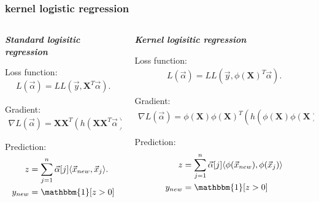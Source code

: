 \documentclass[handout,compress]{beamer}
\newcommand{\bv}[1]{\mathbf{#1}}
\begin{document}
\begin{frame} 
	\frametitle{kernel logistic regression}
	\begin{columns}[t]
		\begin{column}{.5\textwidth}
			\emph{\textbf{Standard logisitic regression}}
			\vspace{1em}
			
			Loss function: 
			\begin{align*}
			L(\vec{\alpha}) = LL(\vec{y}, \bv{X}^T\vec{\alpha}).
			\end{align*}
			
			
			Gradient:
			\begin{align*}
			\nabla L(\vec{\alpha}) = \bv{X}\bv{X}^T(h(\bv{X}\bv{X}^T\vec{\alpha}) - \vec{y}).
			\end{align*}
			
			Prediction:
			\begin{align*}
			z &= \sum_{j=1}^n \vec{\alpha}[j] \langle\vec{x}_{new}, \vec{x}_j\rangle.\\
			y_{new} &= \mathbbm{1}[z > 0]
			\end{align*}
		\end{column}
		\begin{column}{.5\textwidth}
			\emph{\textbf{Kernel logisitic regression}}
			\vspace{1em}
			
			Loss function: 
			\begin{align*}
			L(\vec{\alpha}) = LL(\vec{y}, \phi(\bv{X})^T\vec{\alpha}).
			\end{align*}
			
			
			Gradient:
			\begin{align*}
			\nabla L(\vec{\alpha}) = \phi(\bv{X})\phi(\bv{X})^T(h(\phi(\bv{X})\phi(\bv{X})^T\vec{\alpha}) - \vec{y}).
			\end{align*}
			
			Prediction:
			\begin{align*}
			z &= \sum_{j=1}^n \vec{\alpha}[j] \langle\phi(\vec{x}_{new}), \phi(\vec{x}_j)\rangle \\
			y_{new} &= \mathbbm{1}[z > 0]
			\end{align*}
		\end{column}
	\end{columns}
\end{frame}
\end{document}
